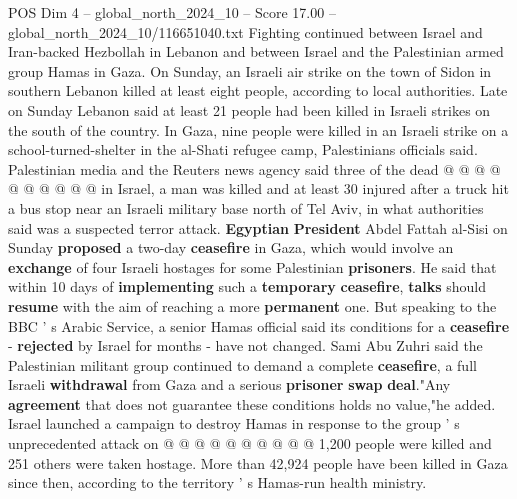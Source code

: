 \begin{textsample}{POS Dim 4 – global\_north\_2024\_10 – Score 17.00 – global\_north\_2024\_10/116651040.txt}
Fighting continued between Israel and Iran-backed Hezbollah in Lebanon and between Israel and the Palestinian armed group Hamas in Gaza.
On Sunday, an Israeli air strike on the town of Sidon in southern Lebanon killed at least eight people, according to local authorities.
Late on Sunday Lebanon said at least 21 people had been killed in Israeli strikes on the south of the country.
In Gaza, nine people were killed in an Israeli strike on a school-turned-shelter in the al-Shati refugee camp, Palestinians officials said.
Palestinian media and the Reuters news agency said three of the dead @ @ @ @ @ @ @ @ @ @ in Israel, a man was killed and at least 30 injured after a truck hit a bus stop near an Israeli military base north of Tel Aviv, in what authorities said was a suspected terror attack. \textbf{Egyptian} \textbf{President} Abdel Fattah al-Sisi on Sunday \textbf{proposed} a two-day \textbf{ceasefire} in Gaza, which would involve an \textbf{exchange} of four Israeli hostages for some Palestinian \textbf{prisoners}.
He said that within 10 days of \textbf{implementing} such a \textbf{temporary} \textbf{ceasefire}, \textbf{talks} should \textbf{resume} with the aim of reaching a more \textbf{permanent} one.
But speaking to the BBC ' s Arabic Service, a senior Hamas official said its conditions for a \textbf{ceasefire} - \textbf{rejected} by Israel for months - have not changed.
Sami Abu Zuhri said the Palestinian militant group continued to demand a complete \textbf{ceasefire}, a full Israeli \textbf{withdrawal} from Gaza and a serious \textbf{prisoner} \textbf{swap} \textbf{deal}."Any \textbf{agreement} that does not guarantee these conditions holds no value,"he added.
Israel launched a campaign to destroy Hamas in response to the group ' s unprecedented attack on @ @ @ @ @ @ @ @ @ @ 1,200 people were killed and 251 others were taken hostage.
More than 42,924 people have been killed in Gaza since then, according to the territory ' s Hamas-run health ministry.

\end{textsample}
